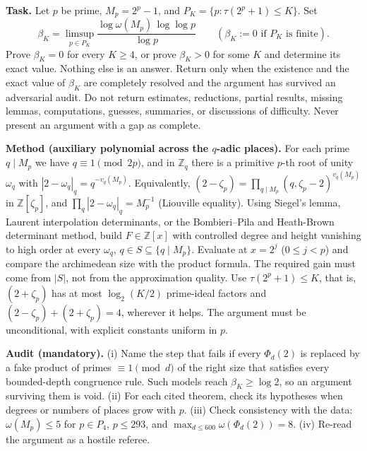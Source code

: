 \noindent\textbf{Task.} Let $p$ be prime, $M_p=2^p-1$, and $P_K=\{p:\tau(2^p+1)\le K\}$. Set
\[
\beta_K=\limsup_{p\in P_K}\frac{\log\omega(M_p)\,\log\log p}{\log p}\qquad(\beta_K:=0\text{ if }P_K\text{ is finite}).
\]
Prove $\beta_K=0$ for every $K\ge4$, or prove $\beta_K>0$ for some $K$ and determine its exact value. Nothing else is an answer. Return only when the existence and the exact value of $\beta_K$ are completely resolved and the argument has survived an adversarial audit. Do not return estimates, reductions, partial results, missing lemmas, computations, guesses, summaries, or discussions of difficulty. Never present an argument with a gap as complete.

\medskip\noindent\textbf{Method (auxiliary polynomial across the $q$-adic places).} For each prime $q\mid M_p$ we have $q\equiv1\pmod{2p}$, and in $\mathbb{Z}_q$ there is a primitive $p$-th root of unity $\omega_q$ with $|2-\omega_q|_q=q^{-v_q(M_p)}$. Equivalently, $(2-\zeta_p)=\prod_{q\mid M_p}(q,\zeta_p-2)^{v_q(M_p)}$ in $\mathbb{Z}[\zeta_p]$, and $\prod_q|2-\omega_q|_q=M_p^{-1}$ (Liouville equality). Using Siegel's lemma, Laurent interpolation determinants, or the Bombieri--Pila and Heath-Brown determinant method, build $F\in\mathbb{Z}[x]$ with controlled degree and height vanishing to high order at every $\omega_q$, $q\in S\subseteq\{q\mid M_p\}$. Evaluate at $x=2^j$ ($0\le j<p$) and compare the archimedean size with the product formula. The required gain must come from $|S|$, not from the approximation quality. Use $\tau(2^p+1)\le K$, that is, $(2+\zeta_p)$ has at most $\log_2(K/2)$ prime-ideal factors and $(2-\zeta_p)+(2+\zeta_p)=4$, wherever it helps. The argument must be unconditional, with explicit constants uniform in $p$.

\medskip\noindent\textbf{Audit (mandatory).} (i) Name the step that fails if every $\Phi_d(2)$ is replaced by a fake product of primes $\equiv1\pmod d$ of the right size that satisfies every bounded-depth congruence rule. Such models reach $\beta_K\ge\log2$, so an argument surviving them is void. (ii) For each cited theorem, check its hypotheses when degrees or numbers of places grow with $p$. (iii) Check consistency with the data: $\omega(M_p)\le5$ for $p\in P_4$, $p\le293$, and $\max_{d\le600}\omega(\Phi_d(2))=8$. (iv) Re-read the argument as a hostile referee.
